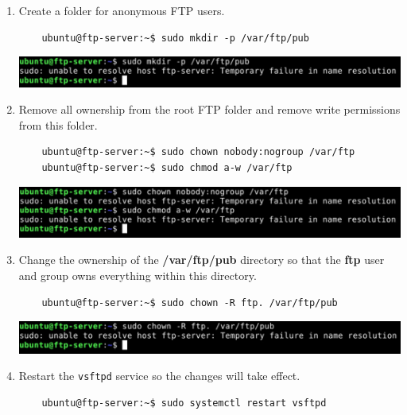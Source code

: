 \documentclass[letterpaper, 12pt]{article}
\begin{document}
\begin{enumerate}
    \item Create a folder for anonymous FTP users.
    \begin{lstlisting}
    ubuntu@ftp-server:~$ sudo mkdir -p /var/ftp/pub
    \end{lstlisting}

    \begin{center}
        \includegraphics[width=\linewidth]{images/part1/step44.png}
    \end{center}

    \item Remove all ownership from the root FTP folder and remove write permissions from this folder.
    \begin{lstlisting}
    ubuntu@ftp-server:~$ sudo chown nobody:nogroup /var/ftp
    ubuntu@ftp-server:~$ sudo chmod a-w /var/ftp
    \end{lstlisting}

    \begin{center}
        \includegraphics[width=\linewidth]{images/part1/step45.png}
    \end{center}

    \item Change the ownership of the \textbf{/var/ftp/pub} directory so that the \textbf{ftp} user and group owns
    everything within this directory.
    \begin{lstlisting}
    ubuntu@ftp-server:~$ sudo chown -R ftp. /var/ftp/pub
    \end{lstlisting}

    \begin{center}
        \includegraphics[width=\linewidth]{images/part1/step46.png}
    \end{center}

    \item Restart the \texttt{vsftpd} service so the changes will take effect.
    \begin{lstlisting}
    ubuntu@ftp-server:~$ sudo systemctl restart vsftpd
    \end{lstlisting}


\end{enumerate}
\end{document}
